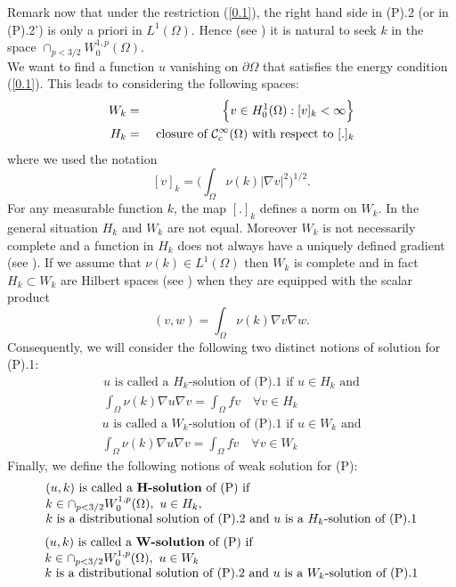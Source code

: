 \documentclass{elsart}
\begin{document}
Remark now that under the restriction (\ref{0.1}), the right hand side
in (P).2 (or in (P).2') is only a priori in $L^1(\Omega)$. Hence 
(see \cite{BG}) it is natural to seek $k$ in the space 
$\cap_{p<3/2} W_0^{1,p}(\Omega)$. \\ 
We want to find a function $u$ vanishing on $\partial \Omega$ that
satisfies the energy condition (\ref{0.1}). This leads to considering the 
following spaces:
\begin{eqnarray}
W_k &=& \Big\{ v \in H^1_0(\Omega) : [v]_k < \infty \Big\} \notag \\ 
H_k &=& \text{ closure of } \mathcal{C}_c^{\infty}(\Omega) \text{ with
  respect to } [.]_k \notag 
\end{eqnarray}
where we used the notation 
$$[v]_k = \big( \int_{\Omega} \nu(k)|\nabla v|^2 \big)^{1/2}.$$
For any measurable function $k$, the map $[.]_k$ defines a
norm on $W_k$. In the general situation $H_k$ and $W_k$ are not
equal. Moreover $W_k$ is not necessarily complete and a function in 
$H_k$ does not always have a uniquely defined gradient (see \cite{zhikov}). If we 
assume that $\nu(k) \in L^1(\Omega)$ then $W_k$ is complete and in
fact $H_k \subset W_k$ are Hilbert spaces (see \cite{drey,zhikov,cassano}) when they are equipped with
the scalar product 
$$(v,w) = \int_{\Omega} \nu(k) \nabla v \nabla w.$$ 
Consequently, we will consider the following two distinct notions of
solution for (P).1:
$$ 
\begin{array}{l}
u \text{ is called a } H_k\text{-solution of (P).1 if } u \in H_k
\text{ and} \\
\int_{\Omega} \nu(k) \nabla u \nabla v = \int_{\Omega} f v \quad 
\forall v \in H_k
\end{array}$$
$$
\begin{array}{l}
u \text{ is called a } W_k\text{-solution of (P).1 if } u \in W_k
\text{ and} \\
\int_{\Omega} \nu(k) \nabla u \nabla v = \int_{\Omega} f v \quad 
\forall v \in W_k
\end{array}$$ 
Finally, we define the following notions of weak solution for (P):
$$ 
\begin{array}{l}
(u,k) \text{ is called a {\bf H-solution} of (P) if } \\ 
k \in \cap_{p<3/2} W_0^{1,p}(\Omega), \ u \in H_k, \\ 
k \text{ is a distributional solution of (P).2 and } u \text{ is a } H_k
\text{-solution of (P).1} 
\end{array}$$
$$
\begin{array}{l}
(u,k) \text{ is called a {\bf W-solution} of (P) if } \\ 
k \in \cap_{p<3/2} W_0^{1,p}(\Omega), \ u \in W_k \\ 
k \text{ is a distributional solution of (P).2 and } u \text{ is a } W_k
\text{-solution of (P).1} 
\end{array}$$
\end{document}
